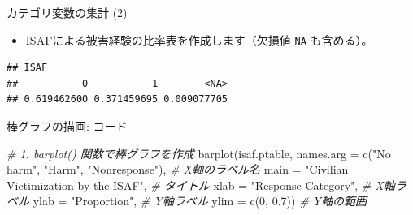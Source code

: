 \documentclass[
  ignorenonframetext,
]{beamer}
\newenvironment{Shaded}{\begin{snugshade}}{\end{snugshade}}
\newcommand{\AttributeTok}[1]{\textcolor[rgb]{0.77,0.63,0.00}{#1}}
\newcommand{\CommentTok}[1]{\textcolor[rgb]{0.56,0.35,0.01}{\textit{#1}}}
\newcommand{\ConstantTok}[1]{\textcolor[rgb]{0.00,0.00,0.00}{#1}}
\newcommand{\DecValTok}[1]{\textcolor[rgb]{0.00,0.00,0.81}{#1}}
\newcommand{\FloatTok}[1]{\textcolor[rgb]{0.00,0.00,0.81}{#1}}
\newcommand{\FunctionTok}[1]{\textcolor[rgb]{0.00,0.00,0.00}{#1}}
\newcommand{\NormalTok}[1]{#1}
\newcommand{\OtherTok}[1]{\textcolor[rgb]{0.56,0.35,0.01}{#1}}
\newcommand{\SpecialCharTok}[1]{\textcolor[rgb]{0.00,0.00,0.00}{#1}}
\newcommand{\StringTok}[1]{\textcolor[rgb]{0.31,0.60,0.02}{#1}}
\providecommand{\tightlist}{%
  \setlength{\itemsep}{0pt}\setlength{\parskip}{0pt}}
\begin{document}
\begin{frame}[fragile]{カテゴリ変数の集計 (2)}
\protect\hypertarget{ux30abux30c6ux30b4ux30eaux5909ux6570ux306eux96c6ux8a08-2}{}
\begin{itemize}
\tightlist
\item
  ISAFによる被害経験の比率表を作成します（欠損値 \texttt{NA}
  も含める）。
\end{itemize}

\scriptsize

\begin{Shaded}
\end{Shaded}

\begin{verbatim}
## ISAF
##           0           1        <NA> 
## 0.619462600 0.371459695 0.009077705
\end{verbatim}

\normalsize
\end{frame}

\begin{frame}[fragile]{棒グラフの描画: コード}
\protect\hypertarget{ux68d2ux30b0ux30e9ux30d5ux306eux63cfux753b-ux30b3ux30fcux30c9}{}
\scriptsize

\begin{Shaded}
\begin{Highlighting}[]
\CommentTok{\# 1. barplot() 関数で棒グラフを作成}
\FunctionTok{barplot}\NormalTok{(isaf.ptable,}
        \AttributeTok{names.arg =} \FunctionTok{c}\NormalTok{(}\StringTok{"No harm"}\NormalTok{, }\StringTok{"Harm"}\NormalTok{, }\StringTok{"Nonresponse"}\NormalTok{), }\CommentTok{\# X軸のラベル名}
        \AttributeTok{main =} \StringTok{"Civilian Victimization by the ISAF"}\NormalTok{,     }\CommentTok{\# タイトル}
        \AttributeTok{xlab =} \StringTok{"Response Category"}\NormalTok{,                      }\CommentTok{\# X軸ラベル}
        \AttributeTok{ylab =} \StringTok{"Proportion"}\NormalTok{,                             }\CommentTok{\# Y軸ラベル}
        \AttributeTok{ylim =} \FunctionTok{c}\NormalTok{(}\DecValTok{0}\NormalTok{, }\FloatTok{0.7}\NormalTok{))                                }\CommentTok{\# Y軸の範囲}
\end{Highlighting}
\end{Shaded}

\normalsize
\end{frame}
\end{document}
